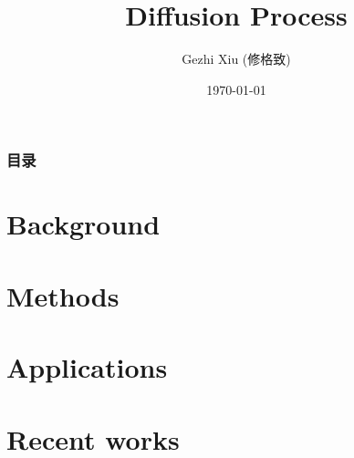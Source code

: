 \documentclass{beamer}
\title[Diffusion]{Diffusion Process}
\author{Gezhi Xiu (修格致)}
\institute[IRSGIS@PKU]{IRSGIS PKU}
\date{\today}
\begin{document}
\begin{frame}
\titlepage
\end{frame}

\begin{frame}
\frametitle{目录}
\tableofcontents
\end{frame}

\section{Background}

\section{Methods}

\section{Applications}

\section{Recent works}


%
% 
\end{document}
